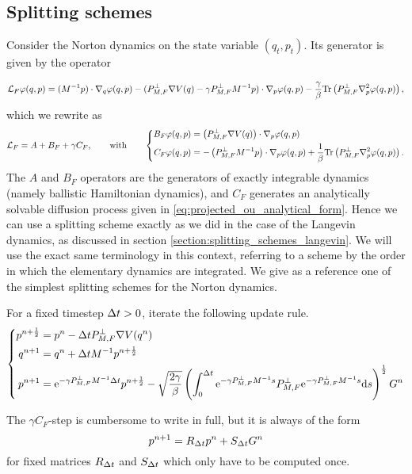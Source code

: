 \subsection{Splitting schemes}
Consider the Norton dynamics on the state variable $(q_t,p_t)$. Its generator is given by the operator

\begin{equation}
    \label{eq:norton_generator}
    \mathcal{L}_F\varphi(q,p)=(M^{-1}p)\cdot \nabla_q\varphi(q,p)-(P_{M,F}^\perp\nabla V(q)-\gamma P_{M,F}^\perp M^{-1}p)\cdot\nabla_p\varphi(q,p)-\frac{\gamma}\beta\mathrm{Tr}\left(P_{M,F}^\perp\nabla_p^2\varphi(q,p)\right),
\end{equation}
which we rewrite as 
\begin{equation}
    \label{eq:norton_generator_splitting}
    \mathcal{L}_F=A+B_F+\gamma C_F,\qquad \text{with} \qquad
    \left\{\begin{aligned}
        B_F\varphi(q,p)&=\left(P_{M,F}^\perp\nabla V(q)\right)\cdot \nabla_p\varphi(q,p)\\
        C_F\varphi(q,p)&=-\left(P_{M,F}^\perp M^{-1}p\right)\cdot\nabla_p\varphi(q,p)+\frac1\beta\mathrm{Tr}\left(P_{M,F}^\perp\nabla_p^2\varphi(q,p)\right).
    \end{aligned}\right.
\end{equation}
The $A$ and $B_F$ operators are the generators of exactly integrable dynamics (namely ballistic Hamiltonian dynamics), and $C_F$ generates an analytically solvable diffusion process given in \eqref{eq:projected_ou_analytical_form}. Hence we can use a splitting scheme exactly as we did in the case of the Langevin dynamics, as discussed in section \ref{section:splitting_schemes_langevin}. 
We will use the exact same terminology in this context, referring to a scheme by the order in which the elementary dynamics are integrated.
We give as a reference one of the simplest splitting schemes for the Norton dynamics.

\begin{algorithm}
    For a fixed timestep ${\Delta t}>0$, iterate the following update rule.
    \begin{equation}
        \left\{
            \begin{aligned}
                p^{n+\frac12}&=p^n-{\Delta t} P_{M,F}^\perp \nabla V(q^n)\\
                q^{n+1}&=q^n+{\Delta t} M^{-1}p^{n+\frac12}\\
                p^{n+1}&=\mathrm{e}^{-\gamma P_{M,F}^\perp M^{-1}{\Delta t}}p^{n+\frac12}-\sqrt{\frac{2\gamma}{\beta}}\left(\int_0^{\Delta t}\mathrm{e}^{-\gamma P_{M,F}^\perp M^{-1}s}P_{M,F}^\perp\mathrm{e}^{-\gamma P_{M,F}^\perp M^{-1}s} \mathrm{d} s\right)^{\frac12}G^n
            \end{aligned}\right.
    \end{equation}
\end{algorithm}
The $\gamma C_F$-step is cumbersome to write in full, but it is always of the form 
\[p^{n+1}=R_{\Delta t} p^n + S_{\Delta t} G^n\]
for fixed matrices $R_{\Delta t}$ and $S_{\Delta t}$ which only have to be computed once.

